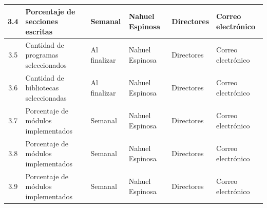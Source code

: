 \documentclass[11pt]{charter}
\begin{document}
\begin{table}[!htpb]
\begin{tabularx}{\linewidth}{@{}|c|m{3.5cm}|X|X|X|X|@{}}
 3.4  & Porcentaje de secciones escritas                   & Semanal      & Nahuel Espinosa & Directores & Correo electrónico \\ \hline
 3.5  & Cantidad de programas seleccionados                & Al finalizar & Nahuel Espinosa & Directores & Correo electrónico \\ \hline
 3.6  & Cantidad de bibliotecas seleccionadas              & Al finalizar & Nahuel Espinosa & Directores & Correo electrónico \\ \hline
 3.7  & Porcentaje de módulos implementados                & Semanal      & Nahuel Espinosa & Directores & Correo electrónico \\ \hline
 3.8  & Porcentaje de módulos implementados                & Semanal      & Nahuel Espinosa & Directores & Correo electrónico \\ \hline
 3.9  & Porcentaje de módulos implementados                & Semanal      & Nahuel Espinosa & Directores & Correo electrónico \\ \hline
\end{tabularx}%
\end{table}
\end{document}
